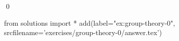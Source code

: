 
\begin{ex} 
  \label{ex:group-theory-0}
  
  \qed
\end{ex} 
\begin{python0}
from solutions import *
add(label="ex:group-theory-0",
    srcfilename='exercises/group-theory-0/answer.tex') 
\end{python0}
